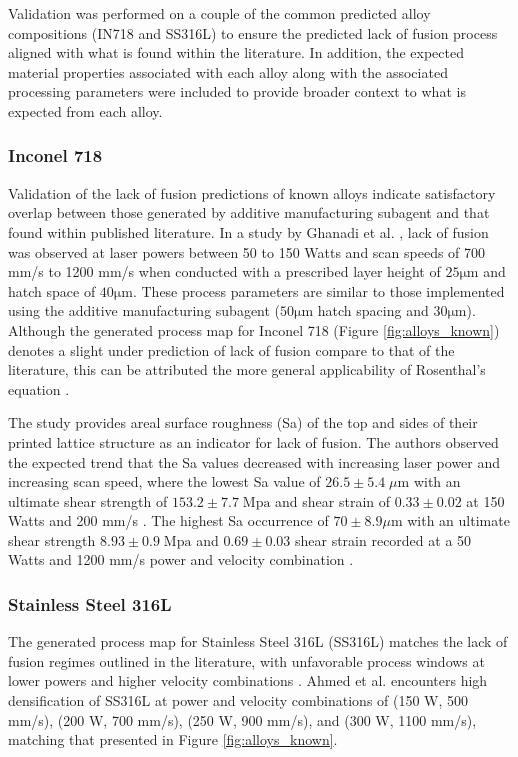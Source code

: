 Validation was performed on a couple of the common predicted alloy compositions
(IN718 and SS316L) to ensure the predicted lack of fusion process
aligned with what is found within the literature. In addition, the expected
material properties associated with each alloy along with the associated
processing parameters were included to provide broader context to what is
expected from each alloy.

\subsubsection{Inconel 718}
Validation of the lack of fusion predictions of known alloys indicate
satisfactory overlap between those generated by additive manufacturing subagent
and that found within published literature. In a study by Ghanadi et al.
\cite{ghanadi_effect_2025}, lack of fusion was observed at laser powers between
50 to 150 Watts and scan speeds of 700 mm/s to 1200 mm/s when conducted with a
prescribed layer height of $25 \mathrm{\mu m}$ and hatch space of $40
\mathrm{\mu m}$. These process parameters are similar to those implemented using
the additive manufacturing subagent ($50 \mathrm{\mu m}$ hatch spacing and $30
\mathrm{\mu m}$). Although the generated process map for Inconel 718 (Figure
\ref{fig:alloys_known}) denotes a slight under prediction of lack of fusion
compare to that of the literature, this can be attributed the more general
applicability of Rosenthal's equation \cite{rosenthal_theory_2022}.

The study provides areal surface roughness (Sa) of the top and sides of their
printed lattice structure as an indicator for lack of fusion. The authors
observed the expected trend that the Sa values decreased with increasing laser
power and increasing scan speed, where the lowest Sa value of $26.5 \pm 5.4
\;\mu\text{m}$ with an ultimate shear strength of $153.2 \pm 7.7\;\text{Mpa}$
and shear strain of $0.33 \pm 0.02$ at 150 Watts and 200
mm/s \cite{ghanadi_effect_2025}. The highest Sa occurrence of $70 \pm 8.9
\mu\text{m}$ with an ultimate shear strength $8.93 \pm 0.9\;\text{Mpa}$ and
$0.69 \pm 0.03$ shear strain recorded at a 50 Watts and 1200 mm/s power and
velocity combination \cite{ghanadi_effect_2025}.

\subsubsection{Stainless Steel 316L}
The generated process map for Stainless Steel 316L (SS316L) matches the lack of
fusion regimes outlined in the literature, with unfavorable process windows at
lower powers and higher velocity combinations \cite{ahmed_process_2022,
huang_microstructure_2025, parikh_property-graded_2023}. Ahmed et al.
\cite{ahmed_process_2022} encounters high densification of SS316L at power and
velocity combinations of (150 W, 500 mm/s), (200 W, 700 mm/s), (250 W, 900
mm/s), and (300 W, 1100 mm/s), matching that presented in Figure
\ref{fig:alloys_known}.

